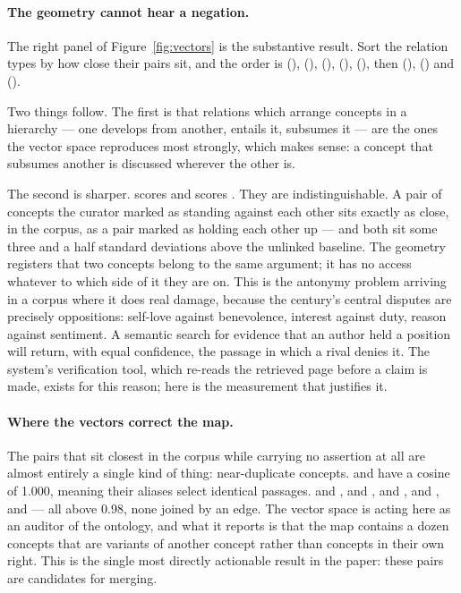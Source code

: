 \paragraph{The geometry cannot hear a negation.}
The right panel of Figure~\ref{fig:vectors} is the substantive result. Sort
the relation types by how close their pairs sit, and the order is
 (\CosDevelopsFrom{}),  (\CosEntails{}),
 (\CosSubsumes{}),  (\CosUnderlies{}),
 (\CosRequires{}), then 
(\CosContrastsWith{}),  (\CosOpposes{}) and 
(\CosSupports{}).

Two things follow. The first is that relations which arrange concepts in a
hierarchy --- one develops from another, entails it, subsumes it --- are the
ones the vector space reproduces most strongly, which makes sense: a concept
that subsumes another is discussed wherever the other is.

The second is sharper.  scores \CosOpposes{} and 
scores \CosSupports{}. They are indistinguishable. A pair of concepts the
curator marked as standing against each other sits exactly as close, in the
corpus, as a pair marked as holding each other up --- and both sit some three
and a half standard deviations above the unlinked baseline. The geometry
registers that two concepts belong to the same argument; it has no access
whatever to which side of it they are on. This is the antonymy problem
\citep{mohammad2013,nguyen2016} arriving in a corpus where it does real damage,
because the century's central disputes are precisely oppositions: self-love
against benevolence, interest against duty, reason against sentiment. A
semantic search for evidence that an author held a position will return, with
equal confidence, the passage in which a rival denies it. The system's
verification tool, which re-reads the retrieved page before a claim is made,
exists for this reason; here is the measurement that justifies it.

\paragraph{Where the vectors correct the map.}
The pairs that sit closest in the corpus while carrying no assertion at all
are almost entirely a single kind of thing: near-duplicate concepts.
 and  have a cosine of 1.000,
meaning their aliases select identical passages.  and
,  and ,
 and ,  and
,  and  --- all above 0.98, none joined by an edge. The vector space is
acting here as an auditor of the ontology, and what it reports is that the map
contains a dozen concepts that are variants of another concept rather than
concepts in their own right. This is the single most directly actionable
result in the paper: these pairs are candidates for merging.


